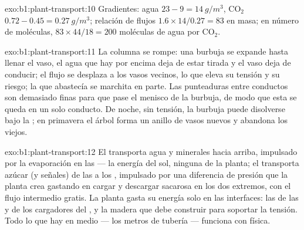 \begin{solution}{exo:b1:plant-transport:10}
Gradientes: agua $23 - 9 = \qty{14}{g/m^3}$, $\mathrm{CO_2}$ $0.72 -
0.45 = \qty{0.27}{g/m^3}$; relación de flujos $1.6\times 14/0.27 = 83$ en masa; en
número de moléculas, $83\times 44/18 = 200$ moléculas de agua por
$\mathrm{CO_2}$.
\end{solution}

\begin{solution}{exo:b1:plant-transport:11}
La columna se rompe: una burbuja se expande hasta llenar el vaso, el agua
que hay por encima deja de estar tirada y el vaso deja de conducir; el flujo
se desplaza a los vasos vecinos, lo que eleva su tensión y su riesgo; la
 que abastecía se marchita en parte. Las punteaduras entre conductos son
demasiado finas para que pase el menisco de la burbuja, de modo que esta se
queda en un solo conducto. De noche, sin tensión, la burbuja puede
disolverse bajo la ; en primavera el árbol forma un anillo
de vasos nuevos y abandona los viejos.
\end{solution}

\begin{solution}{exo:b1:plant-transport:12}
El  transporta agua y minerales hacia arriba, impulsado por la
evaporación en las  --- la energía del sol, ninguna de la planta; el
 transporta azúcar (y señales) de las  a los ,
impulsado por una diferencia de presión que la planta crea gastando  en
cargar y descargar sacarosa en los dos extremos, con el flujo intermedio
gratis. La planta gasta su energía solo en las interfaces: las  de las  y de los cargadores del , y la
madera que debe construir para soportar la tensión. Todo lo que hay en medio
--- los metros de tubería --- funciona con física.
\end{solution}

